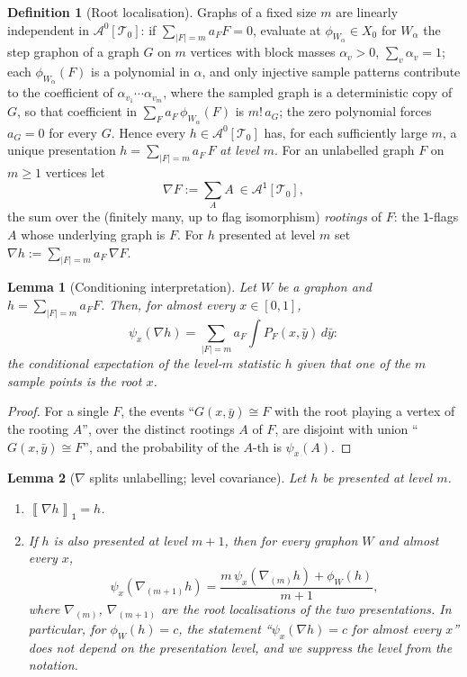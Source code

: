 \documentclass[11pt]{article}
\newtheorem{lemma}[lemma]{Lemma}
\theoremstyle{definition}
\newtheorem{definition}[definition]{Definition}
\newcommand{\A}{\mathcal{A}}
\newcommand{\T}{\mathcal{T}}
\newcommand{\avg}[2]{\left\llbracket #1 \right\rrbracket_{#2}}
\newcommand{\vtype}{\mathsf{1}}
\begin{document}
\begin{definition}[Root localisation]\label{def:root-localisation}
Graphs of a fixed size $m$ are linearly independent in $\A^0[\T_0]$: if
$\sum_{|F|=m}a_FF=0$, evaluate at $\phi_{W_\alpha}\in X_0$ for $W_\alpha$ the step
graphon of a graph $G$ on $m$ vertices with block masses
$\alpha_v>0$, $\sum_v\alpha_v=1$; each $\phi_{W_\alpha}(F)$ is a polynomial in
$\alpha$, and only injective sample patterns contribute to the coefficient of
$\alpha_{v_1}\cdots\alpha_{v_m}$, where the sampled graph is a deterministic copy of
$G$, so that coefficient in $\sum_Fa_F\,\phi_{W_\alpha}(F)$ is $m!\,a_G$; the zero
polynomial forces $a_G=0$ for every $G$.  Hence every $h\in\A^0[\T_0]$ has, for each
sufficiently large $m$, a unique presentation $h=\sum_{|F|=m}a_F\,F$ \emph{at level
$m$}.  For an unlabelled graph $F$ on $m\ge1$ vertices let
\[
  \nabla F:=\sum_{A}A\ \in\A^{\vtype}[\T_0],
\]
the sum over the (finitely many, up to flag isomorphism) \emph{rootings} of $F$: the
$\vtype$-flags $A$ whose underlying graph is $F$.  For $h$ presented at level $m$ set
$\nabla h:=\sum_{|F|=m}a_F\,\nabla F$.
\end{definition}

\begin{lemma}[Conditioning interpretation]\label{lem:conditioning}
Let $W$ be a graphon and $h=\sum_{|F|=m}a_F F$.  Then, for almost every
$x\in[0,1]$,
\[
  \psi_x(\nabla h)=\sum_{|F|=m}a_F\int P_F(x,\bar y)\,d\bar y :
\]
the conditional expectation of the level-$m$ statistic $h$ given that one of the $m$
sample points is the root $x$.
\end{lemma}

\begin{proof}
For a single $F$, the events ``$G(x,\bar y)\cong F$ with the root playing a vertex of
the rooting $A$'', over the distinct rootings $A$ of $F$, are disjoint with union
``$G(x,\bar y)\cong F$'', and the probability of the $A$-th is $\psi_x(A)$.
\end{proof}

\begin{lemma}[$\nabla$ splits unlabelling; level covariance]\label{lem:nabla-basic}
Let $h$ be presented at level $m$.
\begin{enumerate}[label=\textup{(\roman*)}, leftmargin=2.5em]
  \item\label{nb-split} $\avg{\nabla h}{\vtype}=h$.
  \item\label{nb-level} If $h$ is also presented at level $m+1$, then for every graphon
  $W$ and almost every $x$,
  \[
    \psi_x(\nabla_{(m+1)}h)
    =\frac{m\,\psi_x(\nabla_{(m)}h)+\phi_W(h)}{m+1},
  \]
  where $\nabla_{(m)}$, $\nabla_{(m+1)}$ are the root localisations of the two
  presentations.  In particular, for $\phi_W(h)=c$, the statement
  ``$\psi_x(\nabla h)=c$ for almost every $x$'' does not depend on the presentation
  level, and we suppress the level from the notation.
\end{enumerate}
\end{lemma}
\end{document}
